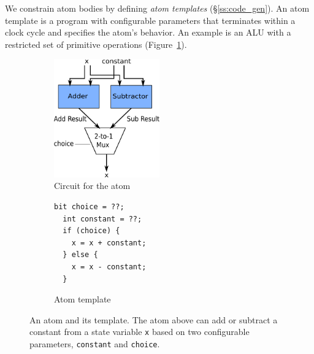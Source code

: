 We constrain atom bodies by defining {\it atom templates}
(\S\ref{ss:code_gen}).  An atom template is a program with configurable
parameters that terminates within a clock cycle and specifies the atom's
behavior.  An example is an ALU with a restricted set of primitive operations
(Figure~\ref{fig:alu_diag}).



\begin{figure}[h]
  \begin{subfigure}{0.5\columnwidth}
  \centering
  \includegraphics[width=0.5\textwidth]{domino_circuit.pdf}
  \caption{Circuit for the atom}
  \label{fig:alu_diag}
  \end{subfigure}
  \hspace{0.1\columnwidth}
  \begin{subfigure}{0.3\columnwidth}
  \begin{lstlisting}[belowskip=-0.8 \baselineskip]
  bit choice = ??;
  int constant = ??;
  if (choice) {
    x = x + constant;
  } else {
    x = x - constant;
  }
  \end{lstlisting}
  \hspace{0.1\columnwidth}
  \caption{Atom template}
  \label{fig:alu_in_sketch}
  \end{subfigure}
  \caption{An atom and its template. The atom above can add or subtract a constant from a state
  variable {\tt x} based on two configurable parameters, {\tt constant} and {\tt choice}.}
  \label{fig:atom}
\end{figure}

